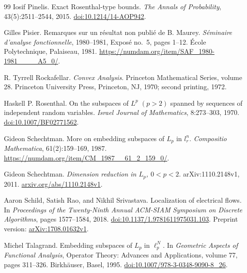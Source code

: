 \documentclass[11pt]{article}
\theoremstyle{remark}
\numberwithin{equation}{section}
\begin{document}
\begin{thebibliography}{99}
Iosif Pinelis.
\newblock Exact Rosenthal-type bounds.
\newblock \emph{The Annals of Probability}, 43(5):2511--2544, 2015.
\newblock \href{https://doi.org/10.1214/14-AOP942}{doi:10.1214/14-AOP942}.

Gilles Pisier.
\newblock Remarques sur un r\'esultat non publi\'e de B. Maurey.
\newblock \emph{S\'eminaire d'analyse fonctionnelle}, 1980--1981,
Expos\'e no.~5, pages 1--12. \'Ecole Polytechnique, Palaiseau, 1981.
\newblock \url{https://numdam.org/item/SAF_1980-1981____A5_0/}.

R. Tyrrell Rockafellar.
\newblock \emph{Convex Analysis}.
\newblock Princeton Mathematical Series, volume 28.
Princeton University Press, Princeton, NJ, 1970; second printing, 1972.

Haskell P. Rosenthal.
\newblock On the subspaces of $L^p$ $(p>2)$ spanned by sequences of
independent random variables.
\newblock \emph{Israel Journal of Mathematics}, 8:273--303, 1970.
\newblock \href{https://doi.org/10.1007/BF02771562}{doi:10.1007/BF02771562}.

Gideon Schechtman.
\newblock More on embedding subspaces of $L_p$ in $l_r^n$.
\newblock \emph{Compositio Mathematica}, 61(2):159--169, 1987.
\newblock \url{https://numdam.org/item/CM_1987__61_2_159_0/}.

Gideon Schechtman.
\newblock \emph{Dimension reduction in $L_p$, $0<p<2$}.
\newblock arXiv:1110.2148v1, 2011.
\newblock \href{https://arxiv.org/abs/1110.2148v1}{arxiv.org/abs/1110.2148v1}.

Aaron Schild, Satish Rao, and Nikhil Srivastava.
\newblock Localization of electrical flows.
\newblock In \emph{Proceedings of the Twenty-Ninth Annual ACM-SIAM
Symposium on Discrete Algorithms}, pages 1577--1584, 2018.
\newblock \href{https://doi.org/10.1137/1.9781611975031.103}
{doi:10.1137/1.9781611975031.103}.
\newblock Preprint version: \href{https://arxiv.org/abs/1708.01632v1}
{arXiv:1708.01632v1}.

Michel Talagrand.
\newblock Embedding subspaces of $L_p$ in $\ell_p^N$.
\newblock In \emph{Geometric Aspects of Functional Analysis},
Operator Theory: Advances and Applications, volume 77, pages 311--326.
Birkh\"auser, Basel, 1995.
\newblock \href{https://doi.org/10.1007/978-3-0348-9090-8_26}
{doi:10.1007/978-3-0348-9090-8\_26}.
\end{thebibliography}
\end{document}

